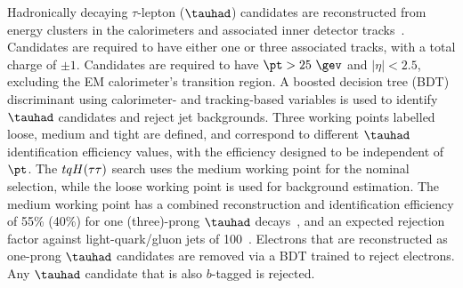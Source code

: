 Hadronically decaying $\tau$-lepton ($\tauhad$) candidates are reconstructed from energy clusters in the calorimeters and
associated inner detector tracks~\cite{ATL-PHYS-PUB-2015-045}. Candidates are required to have either one or three associated tracks,
with a total charge of $\pm 1$. Candidates are required to have $\pt > 25~\gev$ and $|\eta|<2.5$, excluding the EM calorimeter's transition region.
A boosted decision tree (BDT) discriminant using calorimeter- and tracking-based variables is used to identify $\tauhad$ candidates and reject
jet backgrounds. Three working points labelled loose, medium and tight are defined, and correspond to different $\tauhad$ identification efficiency 
values, with the efficiency designed to be independent of $\pt$. The $tqH(\tau\tau)$ search uses the medium
working point for the nominal selection, while the loose working point is used for background estimation.
The medium working point has a combined reconstruction and identification efficiency of 55\% (40\%) for one (three)-prong $\tauhad$ 
decays~\cite{ATLAS-CONF-2017-029}, and an expected rejection factor against light-quark/gluon jets of 100~\cite{ATL-PHYS-PUB-2015-045}. 
Electrons that are reconstructed as one-prong $\tauhad$ candidates are removed via a BDT trained to reject electrons.
Any $\tauhad$ candidate that is also $b$-tagged is rejected.


